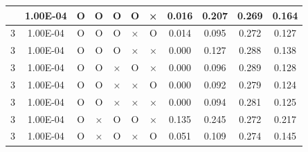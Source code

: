 \documentclass[11pt]{article}
\begin{document}
\begin{longtable}[h]{|r|r|l|l|l|l|l|r|r|l|r|}
\hline
\endlastfoot
\multicolumn{1}{|c|}{3} & \multicolumn{1}{c|}{1.00E-04} & \multicolumn{1}{c|}{O} & \multicolumn{1}{c|}{O} & \multicolumn{1}{c|}{O} & \multicolumn{1}{c|}{O} & \multicolumn{1}{c|}{×} & \multicolumn{1}{c|}{0.016} & \multicolumn{1}{c|}{0.207} & \multicolumn{1}{c|}{0.269} & \multicolumn{1}{c|}{0.164} \\ \hline
\multicolumn{1}{|c|}{3} & \multicolumn{1}{c|}{1.00E-04} & \multicolumn{1}{c|}{O} & \multicolumn{1}{c|}{O} & \multicolumn{1}{c|}{O} & \multicolumn{1}{c|}{×} & \multicolumn{1}{c|}{O} & \multicolumn{1}{c|}{0.014} & \multicolumn{1}{c|}{0.095} & \multicolumn{1}{c|}{0.272} & \multicolumn{1}{c|}{0.127} \\ \hline
\multicolumn{1}{|c|}{3} & \multicolumn{1}{c|}{1.00E-04} & \multicolumn{1}{c|}{O} & \multicolumn{1}{c|}{O} & \multicolumn{1}{c|}{O} & \multicolumn{1}{c|}{×} & \multicolumn{1}{c|}{×} & \multicolumn{1}{c|}{0.000} & \multicolumn{1}{c|}{0.127} & \multicolumn{1}{c|}{0.288} & \multicolumn{1}{c|}{0.138} \\ \hline
\multicolumn{1}{|c|}{3} & \multicolumn{1}{c|}{1.00E-04} & \multicolumn{1}{c|}{O} & \multicolumn{1}{c|}{O} & \multicolumn{1}{c|}{×} & \multicolumn{1}{c|}{O} & \multicolumn{1}{c|}{×} & \multicolumn{1}{c|}{0.000} & \multicolumn{1}{c|}{0.096} & \multicolumn{1}{c|}{0.289} & \multicolumn{1}{c|}{0.128} \\ \hline
\multicolumn{1}{|c|}{3} & \multicolumn{1}{c|}{1.00E-04} & \multicolumn{1}{c|}{O} & \multicolumn{1}{c|}{O} & \multicolumn{1}{c|}{×} & \multicolumn{1}{c|}{×} & \multicolumn{1}{c|}{O} & \multicolumn{1}{c|}{0.000} & \multicolumn{1}{c|}{0.092} & \multicolumn{1}{c|}{0.279} & \multicolumn{1}{c|}{0.124} \\ \hline
\multicolumn{1}{|c|}{3} & \multicolumn{1}{c|}{1.00E-04} & \multicolumn{1}{c|}{O} & \multicolumn{1}{c|}{O} & \multicolumn{1}{c|}{×} & \multicolumn{1}{c|}{×} & \multicolumn{1}{c|}{×} & \multicolumn{1}{c|}{0.000} & \multicolumn{1}{c|}{0.094} & \multicolumn{1}{c|}{0.281} & \multicolumn{1}{c|}{0.125} \\ \hline
\multicolumn{1}{|c|}{3} & \multicolumn{1}{c|}{1.00E-04} & \multicolumn{1}{c|}{O} & \multicolumn{1}{c|}{×} & \multicolumn{1}{c|}{O} & \multicolumn{1}{c|}{O} & \multicolumn{1}{c|}{×} & \multicolumn{1}{c|}{0.135} & \multicolumn{1}{c|}{0.245} & \multicolumn{1}{c|}{0.272} & \multicolumn{1}{c|}{0.217} \\ \hline
\multicolumn{1}{|c|}{3} & \multicolumn{1}{c|}{1.00E-04} & \multicolumn{1}{c|}{O} & \multicolumn{1}{c|}{×} & \multicolumn{1}{c|}{O} & \multicolumn{1}{c|}{×} & \multicolumn{1}{c|}{O} & \multicolumn{1}{c|}{0.051} & \multicolumn{1}{c|}{0.109} & \multicolumn{1}{c|}{0.274} & \multicolumn{1}{c|}{0.145} \\ \hline

\end{longtable}
\end{document}
